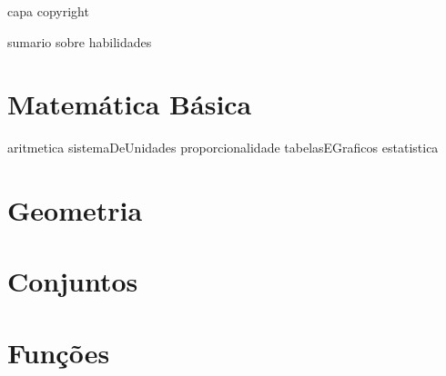 \documentclass[11pt,fleqn]{book}
\begin{document}
{capa} %
{copyright} %

{sumario} %
{sobre} %
{habilidades} %

\part{Matemática Básica}
{aritmetica}
{sistemaDeUnidades}
{proporcionalidade}
{tabelasEGraficos}
{estatistica}

\part{Geometria}

\part{Conjuntos}

\part{Funções}
\end{document}

